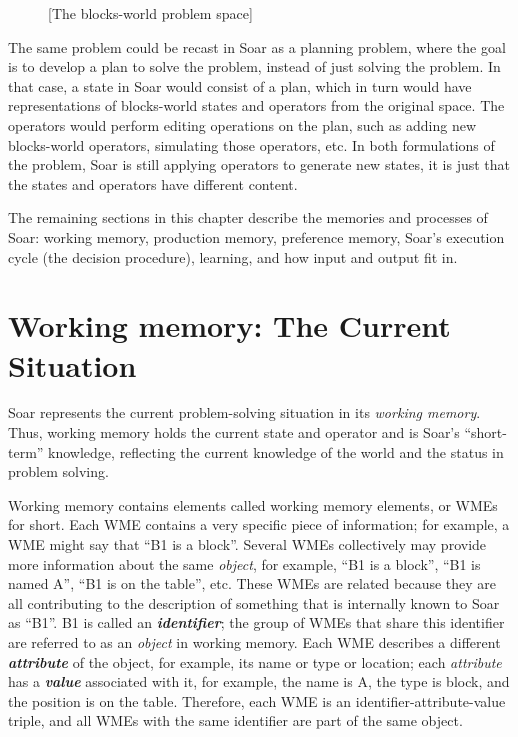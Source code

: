 \begin{figure}
	[The blocks-world problem space]
	\label{fig:blocks-ps}
\end{figure}

The same problem could be recast in Soar as a planning problem, where the goal is to develop a plan to solve the problem, instead of just solving the problem.  In that case, a state in Soar would consist of a plan, which in turn would have representations of blocks-world states and operators from the original space.  The operators would perform editing operations on the plan, such as adding new blocks-world operators, simulating those operators, etc.  In both formulations of the problem, Soar is still applying operators to generate new states, it is just that the states and operators have different content.

The remaining sections in this chapter describe the memories and processes of Soar: working memory, production memory, preference memory, Soar's execution cycle (the decision procedure), learning, and how  input and output fit in.


\section{Working memory: The Current Situation}
\label{ARCH-wm}

Soar represents the current problem-solving situation in its \emph{working memory}. Thus, working memory holds the current state and operator and is Soar's ``short-term'' knowledge, reflecting the current knowledge of the world and the status in problem solving.

Working memory contains elements called working memory elements, or WMEs for short. Each WME contains a very specific piece of information; for example, a WME might say that ``B1 is a block''.  Several WMEs collectively may provide more information about the same \textit{object}, for example, ``B1 is a block'', ``B1 is named A'', ``B1 is on the table'', etc. These WMEs are related because they are all contributing to the description of something that is internally known to Soar as ``B1''. B1 is called an \textbf{\textit{identifier}}; the group of WMEs that share this identifier are referred to as an \textit{object} in working memory.  Each WME describes a different \textbf{\textit{attribute}} of the object, for example, its name or type or location; each \textit{attribute} has a \textbf{\textit{value}} associated with it, for example, the name is A, the type is block, and the position is on the table. Therefore, each WME is an identifier-attribute-value triple, and all WMEs with the same identifier are part of the same object.

